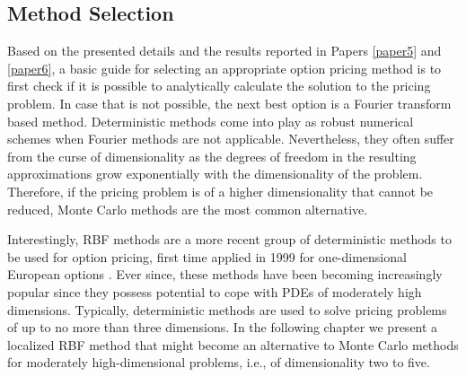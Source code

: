 \documentclass{UUThesisTemplate}
\begin{document}
\subsection{Method Selection}
\par Based on the presented details and the results reported in Papers \ref{paper5} and \ref{paper6}, a basic guide for selecting an appropriate option pricing method is to first check if it is possible to analytically calculate the solution to the pricing problem. In case that is not possible, the next best option is a Fourier transform based method. Deterministic methods come into play as robust numerical schemes when Fourier methods are not applicable. Nevertheless, they often suffer from the curse of dimensionality as the degrees of freedom in the resulting approximations grow exponentially with the dimensionality of the problem. Therefore, if the pricing problem is of a higher dimensionality that cannot be reduced, Monte Carlo methods are the most common alternative.
\par Interestingly, RBF methods are a more recent group of deterministic methods to be used for option pricing, first time applied in 1999 for one-dimensional European options \cite{hon1999radial}. Ever since, these methods have been becoming increasingly popular since they possess potential to cope with PDEs of moderately high dimensions. Typically, deterministic methods are used to solve pricing problems of up to no more than three dimensions. In the following chapter we present a localized RBF method that might become an alternative to Monte Carlo methods for moderately high-dimensional problems, i.e., of dimensionality two to five. 
%
%
\end{document}
